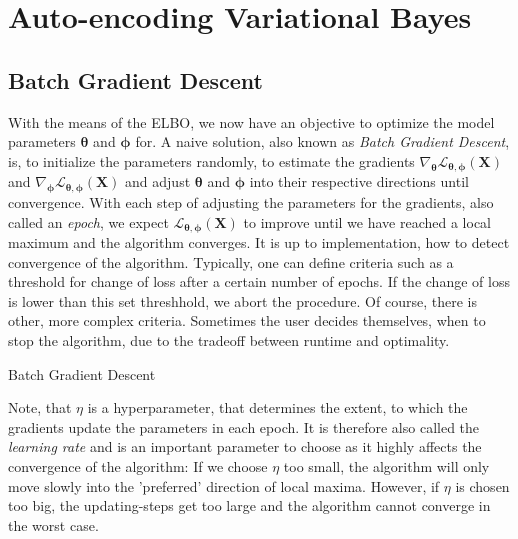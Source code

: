 \documentclass[12pt]{report}
\theoremstyle{definition}
\begin{document}
\section{Auto-encoding Variational Bayes}
\subsection{Batch Gradient Descent}
With the means of the ELBO, we now have an objective to optimize the model parameters $\pmb{\theta}$ and $\pmb{\phi}$ for. A naive solution, also known as \emph{Batch Gradient Descent}, is, to initialize the parameters randomly, to estimate the gradients $\nabla_{\pmb{\theta}}\mathcal{L}_{\pmb{\theta}, \pmb{\phi}}(\mathbf{X})$ and $\nabla_{\pmb{\pmb{\phi}}}\mathcal{L}_{\pmb{\theta}, \pmb{\phi}}(\mathbf{X})$ and adjust $\pmb{\theta}$ and $\pmb{\phi}$ into their respective directions until convergence. With each step of adjusting the parameters for the gradients, also called an \emph{epoch}, we expect $\mathcal{L}_{\pmb{\theta}, \pmb{\phi}}(\mathbf{X})$ to improve until we have reached a local maximum and the algorithm converges. It is up to implementation, how to detect convergence of the algorithm. Typically, one can define criteria such as a threshold for change of loss after a certain number of epochs. If the change of loss is lower than this set threshhold, we abort the procedure. Of course, there is other, more complex criteria. Sometimes the user decides themselves, when to stop the algorithm, due to the tradeoff between runtime and optimality.

\begin{algorithm}[H]
\SetAlgoLined
{}
\caption{Batch Gradient Descent}
\end{algorithm}
Note, that $\eta$ is a hyperparameter, that determines the extent, to which the gradients update the parameters in each epoch. It is therefore also called the \emph{learning rate} and is an important parameter to choose as it highly affects the convergence of the algorithm: If we choose $\eta$ too small, the algorithm will only move slowly into the 'preferred' direction of local maxima. However, if $\eta$ is chosen too big, the updating-steps get too large and the algorithm cannot converge in the worst case.
\end{document}

